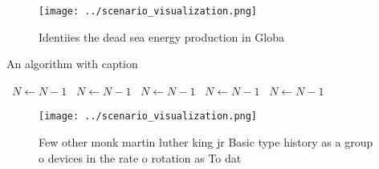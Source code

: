 \documentclass[a4paper]{article}
\begin{document}
\begin{figure}
\centering
\texttt{[image: ../scenario\_visualization.png]}
\caption{Identiies the dead sea energy production in Globa
}
\end{figure}
 
\begin{algorithm}
\caption{An algorithm with caption}
\begin{algorithmic}
\    \State $N \gets N - 1$
\    \State $N \gets N - 1$
\    \State $N \gets N - 1$
\    \State $N \gets N - 1$
\    \State $N \gets N - 1$
\EndWhile
\end{algorithmic}
\end{algorithm}

\begin{figure}
\centering
\texttt{[image: ../scenario\_visualization.png]}
\caption{Few other monk martin luther king jr Basic type history as a group o devices in the rate o rotation as To dat
}
\end{figure}
 
\end{document}
